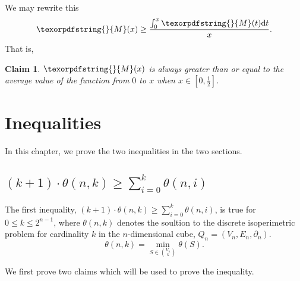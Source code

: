 \documentclass[12pt]{ucthesis}
\theoremstyle{plain}
\newtheorem{claim}{Claim}
\theoremstyle{definition}
\newcommand{\takagi}{
  \texorpdfstring{\protect}{M}
}
\begin{document}
We may rewrite this
\begin{equation*}
\takagi(x) \ge \frac{\int_0^x \takagi(t) \mathrm{d}t}{x}.
\end{equation*}
That is,
\begin{claim}
\label{Claim 2}
$\takagi(x)$ is always greater than or equal to the average value of the function
from $0$ to $x$ when $x \in [0, \frac{1}{2}]$.
\end{claim}

\chapter{Inequalities}
\label{Chapter 4}

In this chapter, we prove the two inequalities in the two sections.

\section{$(k + 1) \cdot \theta(n, k) \ge \sum_{i = 0}^k \theta(n, i)$}

The first inequality, $(k + 1) \cdot \theta(n, k) \ge \sum_{i = 0}^k \theta(n, i)$,
is true for $0 \le k \le 2^{n - 1}$,
where $\theta(n, k)$ denotes the soultion to the discrete isoperimetric problem
for cardinality $k$ in the $n$-dimensional cube, $Q_n = (V_n, E_n, \partial_n)$.
\begin{equation*}
\theta(n, k) = \min_{S \in \binom{V_n}{k}} \theta(S).
\end{equation*}

We first prove two claims which will be used to prove the inequality.
\end{document}
